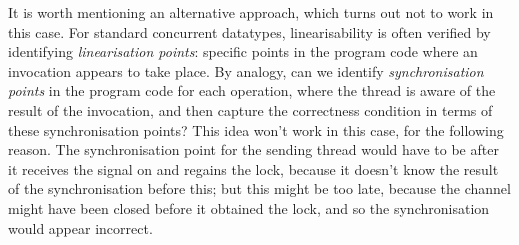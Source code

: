 It is worth mentioning an alternative approach, which turns out not to work in
this case.  For standard concurrent datatypes, linearisability is often
verified by identifying \emph{linearisation points}: specific points in the
program code where an invocation appears to take place.  By analogy, can we
identify \emph{synchronisation points} in the program code for each operation,
where the thread is aware of the result of the invocation, and then capture
the correctness condition in terms of these synchronisation points?  This idea
won't work in this case, for the following reason.  The synchronisation point
for the sending thread would have to be after it receives the signal on
 and regains the lock, because it doesn't know the result of
the synchronisation before this; but this might be too late, because the
channel might have been closed before it obtained the lock, and so the
synchronisation would appear incorrect.
